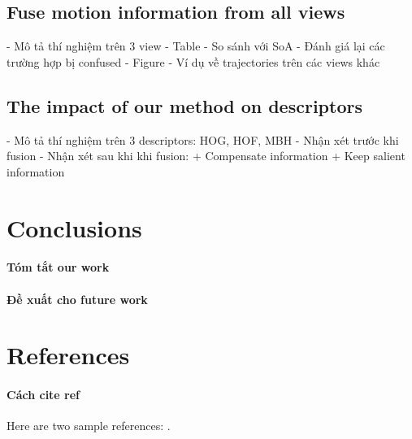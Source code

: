 \documentclass[review]{elsarticle}
\begin{document}
\subsection{Fuse motion information from all views}
- Mô tả thí nghiệm trên 3 view
- Table - So sánh với SoA
- Đánh giá lại các trường hợp bị confused
- Figure - Ví dụ về trajectories trên các views khác

\subsection{The impact of our method on descriptors}
- Mô tả thí nghiệm trên 3 descriptors: HOG, HOF, MBH
- Nhận xét trước khi fusion
- Nhận xét sau khi khi fusion:
    + Compensate information
    + Keep salient information

\section{Conclusions}

\paragraph{Tóm tắt our work}

\paragraph{Đề xuất cho future work}



\section*{References}

\paragraph{Cách cite ref}Here are two sample references: \cite{Feynman1963118,Dirac1953888}.


\end{document}
